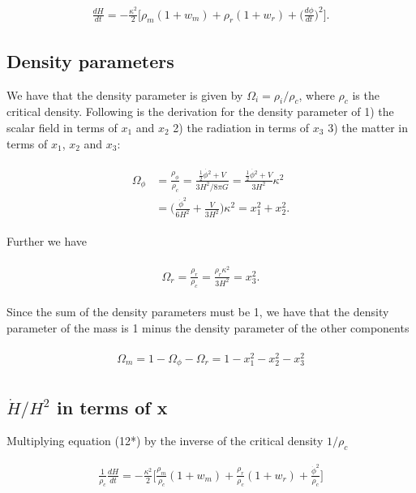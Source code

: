 \documentclass[a4paper,10pt]{article}
\begin{document}
\begin{align}
\frac{dH}{dt} = -\frac{\kappa^2}{2}\bigg[\rho_m(1+w_m) + \rho_r(1+w_r) + \bigg(\frac{d\phi}{dt}\bigg)^2\bigg].
\end{align}


\subsection{Density parameters}
We have that the density parameter is given by $\Omega_i = \rho_i/\rho_c$, where $\rho_c$ is the critical density. Following is the derivation for the density parameter of 1) the scalar field in terms of $x_1$ and $x_2$ 2) the radiation in terms of $x_3$ 3) the matter in terms of $x_1$, $x_2$ and $x_3$:

\begin{align}
\begin{split}
\Omega_{\phi} &= \frac{\rho_{\phi}}{\rho_c} = \frac{ \frac{1}{2}\dot{\phi^2} + V}{3H^2/8\pi G} = \frac{ \frac{1}{2}\dot{\phi^2} + V}{3H^2}\kappa^2 \\
&= \bigg(\frac{\dot{\phi}^2}{6H^2} + \frac{V}{3H^2}\bigg)\kappa^2 = x_1^2 + x_2^2.
\end{split}
\end{align}

Further we have 

\begin{align}
\begin{split}
\Omega_r = \frac{\rho_r}{\rho_c} = \frac{\rho_r \kappa^2}{3H^2} = x_3^2.
\end{split}
\end{align}

Since the sum of the density parameters must be 1, we have that the density parameter of the mass is 1 minus the density parameter of the other components

\begin{align}
\begin{split}
\Omega_m = 1 - \Omega_{\phi} - \Omega_r = 1 - x_1^2 - x_2^2 - x_3^2
\end{split}
\end{align}


\subsection{$\dot{H}/H^2$ in terms of x}
Multiplying equation (12*) by the inverse of the critical density $1/\rho_c$

\begin{align}
\frac{1}{\rho_c}\frac{dH}{dt} = -\frac{\kappa^2}{2}\bigg[\frac{\rho_m}{\rho_c}(1+w_m) + \frac{\rho_r}{\rho_c}(1+w_r) + \frac{\dot{\phi}^2}{\rho_c}\bigg]
\end{align}
\end{document}
